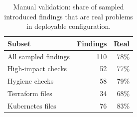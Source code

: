 \begin{table}[t]\centering\caption{Manual validation: share of sampled introduced findings that are real problems in deployable configuration.}\label{tab:validation}\small\begin{tabular}{@{}lrr@{}}\toprule Subset & Findings & Real\\\midrule
All sampled findings & 110 & 78\% \\
High-impact checks & 52 & 77\% \\
Hygiene checks & 58 & 79\% \\
Terraform files & 34 & 68\% \\
Kubernetes files & 76 & 83\% \\
\bottomrule\end{tabular}\end{table}
